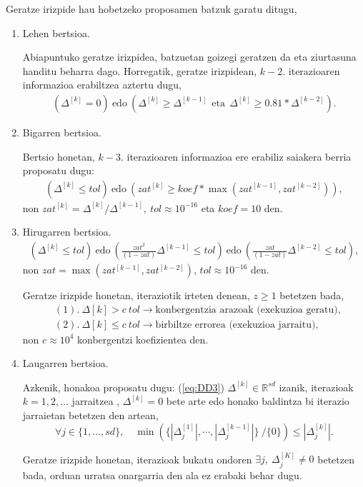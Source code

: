Geratze irizpide hau hobetzeko proposamen batzuk garatu ditugu,
\begin{enumerate}
\item Lehen bertsioa.

Abiapuntuko geratze irizpidea, batzuetan goizegi geratzen da eta ziurtasuna handitu beharra dago.  Horregatik, geratze irizpidean, $k-2.$ iterazioaren informazioa erabiltzea aztertu dugu, 
\begin{align*}
(\Delta^{[k]} = 0) \ \text{edo} \ ( \Delta^{[k]}\geqslant \Delta^{[k-1]} \ \ \text{eta} \ \ \Delta^{[k]}\geqslant 0.81*\Delta^{[k-2]}).
\end{align*}

\item Bigarren bertsioa.

Bertsio honetan, $k-3.$ iterazioaren informazioa ere erabiliz saiakera berria proposatu dugu:
\begin{align*}
\left(\Delta^{[k]} \leqslant tol \right) \ \text{edo} \ \left( zat^{[k]} \geqslant koef*\max(zat^{[k-1]},zat^{[k-2]}) \right),
\end{align*}
non $zat^{[k]}={\Delta^{[k]}}/{\Delta^{[k-1]}}, \ tol\approx10^{-16}$ eta $koef=10$ den.

\item Hirugarren bertsioa.
\begin{align*}
\left(\Delta^{[k]} \leqslant tol\right) \ \text{edo} \ \left(\frac{zat^2}{(1-zat)} \Delta^{[k-1]} \leqslant tol\right) \ \text{edo} \ \left(\frac{zat}{(1-zat)}\Delta^{[k-2]} \leqslant tol\right),
\end{align*}
non $zat=\max(zat^{[k-1]},zat^{[k-2]})$, $tol\approx10^{-16}$ den.

Geratze irizpide honetan, iteraziotik irteten denean, $z\geqslant1$ betetzen bada,
\begin{align*}
&(1). \ \Delta {[k]} > c \ tol \rightarrow \text{konbergentzia arazoak (exekuzioa geratu)},\\
&(2). \ \Delta {[k]} \leqslant c \ tol \rightarrow \text{birbiltze errorea (exekuzioa jarraitu)},
\end{align*}   
non $c\approx 10^{4}$ konbergentzi koefizientea den. 

\item Laugarren bertsioa.

Azkenik, honakoa proposatu dugu: (\ref{eq:DD3}) $\Delta ^{[k]} \in \mathbb{R}^{sd}$ izanik, iterazioak  $k=1,2,\ldots$ jarraitzea , $ \Delta^{[k]} =0$ bete arte edo honako baldintza bi iterazio jarraietan betetzen den artean,
\begin{equation*}
\forall j \in \{1,\ldots,s d\},  \quad
\min \left(\{|\Delta_j^{[1]}|,\cdots ,|\Delta_j^{[k-1]}|\} \ /\{0\} \right) \leqslant |\Delta_j^{[k]}|.
\end{equation*}

Geratze irizpide honetan, iterazioak bukatu ondoren $\exists j,  \ \Delta_{j}^{[K]} \neq 0$ betetzen bada, orduan urratsa onargarria den ala ez erabaki behar dugu. 


\end{enumerate}

